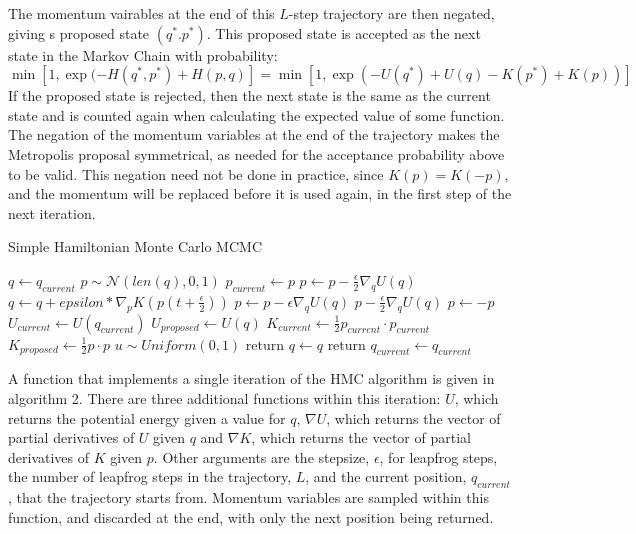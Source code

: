 \documentclass[]{report}
\begin{document}
The momentum vairables at the end of this $L$-step trajectory are then negated, giving s proposed state $(q^{*}. p^{*})$. This proposed state is accepted as the next state in the Markov Chain with probability: \begin{equation}
\min[1, \exp(-H(q^{*}, p^{*}) + H(p,q)] = \min[1, \exp(-U(q^{*}) + U(q) - K(p^{*}) + K(p))]
\end{equation} 
If the proposed state is rejected, then the next state is the same as the current state and is counted again when calculating the expected value of some function. 
The negation of the momentum variables at the end of the trajectory makes the Metropolis proposal symmetrical, as needed for the acceptance probability above to be valid. This negation need not be done in practice, since $K(p) = K(-p)$, and the momentum will be replaced before it is used again, in the first step of the next iteration.\label{key}

\begin{algorithm}
	\label{alg:simpHMC}
	\caption{Simple Hamiltonian Monte Carlo MCMC}
	\begin{algorithmic}[1]
		\State $ q \gets q_{current}$
		\State $ p \sim \mathcal{N}(len(q),0,1)$
		\State $ p_{current} \gets p$
		\State $ p \gets p - \frac{\epsilon}{2}\nabla_{q} U(q)$  
		\State $q \gets q + epsilon * \nabla_{p} K (p(t + \frac{\epsilon}{2}))$  
		\State $p \gets p- \epsilon \nabla_{q} U(q)$
		\EndIf
		\EndFor
		\State $p - \frac{\epsilon}{2}\nabla_{q} U(q)$ 
		\State $p \gets - p$ 
		\State $U_{current} \gets U(q_{current})$
		\State $U_{proposed} \gets U(q)$
		\State $K_{current} \gets \frac{1}{2} p_{current} \cdot p_{current} $
		\State $K_{proposed} \gets \frac{1}{2} p \cdot p$
		\State $ u \sim Uniform(0,1)$
		\State $\text{return } q \gets q$ 
		\Else
		\State $\text{return } q_{current} \gets q_{current}$ 
		\EndIf
	\end{algorithmic} 
\end{algorithm}
A function that implements a single iteration of the HMC algorithm is given in algorithm 2. There are three additional functions within this iteration: $U$, which returns the potential energy given a value for $q$,  $\nabla U$, which returns the vector of partial derivatives of $U$ given $q$ and $\nabla K$, which returns the vector of partial derivatives of $K$ given $p$. Other arguments are the stepsize, $\epsilon$, for leapfrog steps, the number of leapfrog steps in the trajectory, $L$, and the current position, $q_{current}$, that the trajectory starts from. Momentum variables are sampled within this function, and discarded at the end, with only the next position being returned. 
\end{document}
